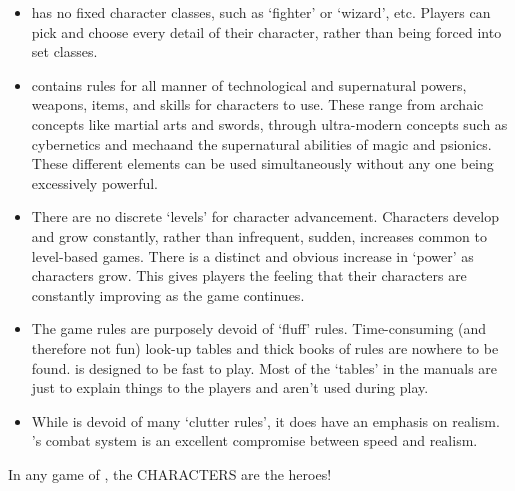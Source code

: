 \documentclass[twoside]{book}
\begin{document}
\begin{itemize}
      
  \item   
               \APATHY{}  has no fixed character classes, such as
                `fighter' or `wizard', etc.
                Players can pick and choose every detail of their
                character, rather than being forced into set classes.
                
            
  \item   
               \APATHY{}  contains rules for all manner of
                technological and supernatural powers, weapons, items,
                and skills for characters to use. These range from
                archaic concepts like martial arts and swords, through
                ultra-modern concepts such as cybernetics and
                mechaand the supernatural abilities of magic and
                psionics. These different elements can be used
                simultaneously without any one being excessively
                powerful.
                
            
  \item   
                 There are no discrete `levels' for
                 character advancement. Characters develop and grow
                 constantly, rather than infrequent, sudden, increases
                 common to level-based games. There is a distinct and
                 obvious increase in `power' as characters
                 grow. This gives players the feeling that their
                 characters are constantly improving as the game
                 continues. 
            
  \item   
                The game rules are purposely devoid of
                `fluff' rules. Time-consuming (and therefore
                not fun) look-up tables and thick books of rules are
                nowhere to be found. \APATHY{}  is designed to be fast
                to play. Most of the `tables' in the \APATHY{}  manuals are just to explain things to the players and
                aren't used during play.
                
            
  \item   
                While \APATHY{}  is devoid of many `clutter
                rules', it does have an emphasis on realism.
                \APATHY{}'s combat system is an excellent
                compromise between speed and realism.
                
            
\end{itemize}
   In any game of \APATHY{}, the CHARACTERS are the
            heroes!
          
\end{document}
